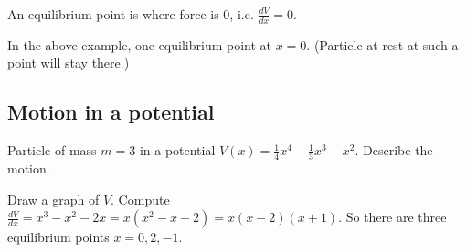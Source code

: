 \documentclass[10pt, a4paper]{article}
\begin{document}
\begin{definition}
    An equilibrium point is where force is $0$,
    i.e. $\frac{dV}{dx} = 0$.
\end{definition}

In the above example,
one equilibrium point at $x = 0$.
(Particle at rest at such a point will stay there.)

\subsection{Motion in a potential}

\begin{example}
    Particle of mass $m = 3$ in a potential $V(x) = \frac{1}{4}x ^ 4 - \frac{1}{3}x ^ 3 - x ^ 2$.
    Describe the motion.

    Draw a graph of $V$.
    Compute $\frac{dV}{dx} = x ^ 3 - x ^ 2 - 2x = x(x ^ 2 - x - 2) = x(x - 2)(x + 1)$.
    So there are three equilibrium points $x = 0, 2, -1$.
\end{example}
\end{document}

